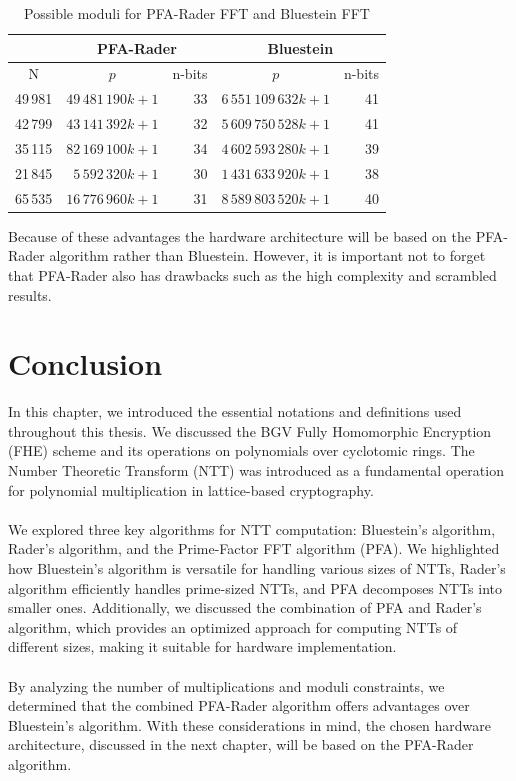 \documentclass[english,master=eelt,masteroption=ec]{kulemt}
\begin{document}
\begin{table}[h!]
\caption{Possible moduli for PFA-Rader FFT and Bluestein FFT}
\label{table:moduli}
\centering
\begin{tabular}{|r|r|r|r|r|} 
 \hline
  & \multicolumn{2}{c|}{PFA-Rader} & \multicolumn{2}{c|}{Bluestein} \\
 \hline
 \multicolumn{1}{|c|}{N} & \multicolumn{1}{c|}{$p$} & \multicolumn{1}{c|}{n-bits} & \multicolumn{1}{c|}{$p$} & \multicolumn{1}{c|}{n-bits}  \\
 \hline
 49\,981 & $49\,481\,190k+1$ & 33 & $6\,551\,109\,632k+1$ & 41 \\ 
 42\,799 & $43\,141\,392k+1$ & 32 & $5\,609\,750\,528k+1$ & 41  \\
 35\,115 & $82\,169\,100k+1$ & 34 & $4\,602\,593\,280k+1$ & 39 \\
 21\,845 & $5\,592\,320k+1$ & 30 & $1\,431\,633\,920k+1$ & 38  \\
 65\,535 & $16\,776\,960k+1$ & 31 & $8\,589\,803\,520k+1$ & 40  \\ 
 \hline
\end{tabular}
\end{table}

Because of these advantages the hardware architecture will be based on the PFA-Rader algorithm rather than Bluestein. However, it is important not to forget that PFA-Rader also has drawbacks such as the high complexity and scrambled results.

\section{Conclusion}
In this chapter, we introduced the essential notations and definitions used throughout this thesis. We discussed the BGV Fully Homomorphic Encryption (FHE) scheme and its operations on polynomials over cyclotomic rings. The Number Theoretic Transform (NTT) was introduced as a fundamental operation for polynomial multiplication in lattice-based cryptography.
\\\\
We explored three key algorithms for NTT computation: Bluestein's algorithm, Rader's algorithm, and the Prime-Factor FFT algorithm (PFA). We highlighted how Bluestein's algorithm is versatile for handling various sizes of NTTs, Rader's algorithm efficiently handles prime-sized NTTs, and PFA decomposes NTTs into smaller ones. Additionally, we discussed the combination of PFA and Rader's algorithm, which provides an optimized approach for computing NTTs of different sizes, making it suitable for hardware implementation.
\\\\
By analyzing the number of multiplications and moduli constraints, we determined that the combined PFA-Rader algorithm offers advantages over Bluestein's algorithm. With these considerations in mind, the chosen hardware architecture, discussed in the next chapter, will be based on the PFA-Rader algorithm.
\end{document}
